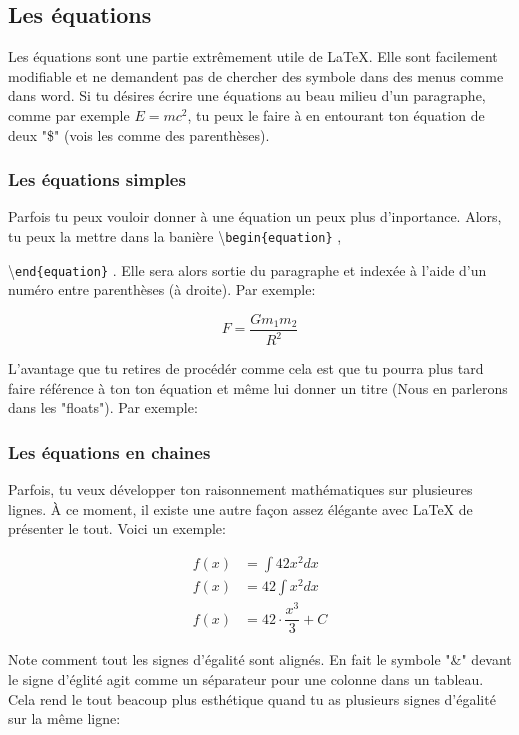 \documentclass[a4paper, 10pt]{article}
\newcommand{\command}[1]{
	\colorbox{codebackground}{\scriptsize{\textbackslash}\texttt{#1}}
}
\begin{document}
\subsection{Les équations}

Les équations sont une partie extrêmement utile de \LaTeX.
Elle sont facilement modifiable et ne demandent pas de chercher des symbole
dans des menus comme dans word. Si tu désires écrire une équations
au beau milieu d'un paragraphe, comme par exemple $E=mc^2$, tu peux le faire
à en entourant ton équation de deux "\$" (vois les comme des parenthèses).

\subsubsection{Les équations simples}
Parfois tu peux vouloir donner à une équation un peux plus d'inportance.
Alors, tu peux la mettre dans la banière \command{begin\{equation\}},
\command{end\{equation\}}. Elle sera alors sortie du paragraphe et indexée
à l'aide d'un numéro entre parenthèses (à droite). Par exemple:

\begin{equation}
	F = \dfrac{ G m_1 m_2 }{ R^2 }
\end{equation}

L'avantage que tu retires de procédér comme cela est que tu pourra
plus tard faire référence à ton ton équation et même lui donner un
titre (Nous en parlerons dans les "floats"). Par exemple:

\subsubsection{Les équations en chaines}
Parfois, tu veux développer ton raisonnement mathématiques sur plusieures
lignes. À ce moment, il existe une autre façon assez élégante avec \LaTeX
de présenter le tout. Voici un exemple:

\begin{align}
	f(x) &= \int{42x^2 } dx \\
	f(x) &= 42\int{x^2 } dx \\
	f(x) &= 42 \cdot \dfrac{x^3}{3} + C
\end{align}

Note comment tout les signes d'égalité sont alignés. En fait le symbole "\&"
devant le signe d'églité agit comme un séparateur pour une colonne dans un
tableau. Cela rend le tout beacoup plus esthétique quand tu as plusieurs
signes d'égalité sur la même ligne:
\end{document}
